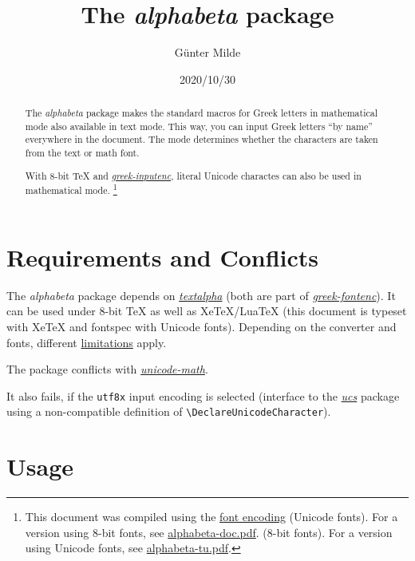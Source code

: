 \documentclass{article}
\newcommand{\engine}{XeTeX}
\newcommand{\engine}{LuaTeX}
\newcommand{\fontset}{fontspec with Unicode fonts}
\newcommand{\engine}{8-bit TeX}
\newcommand{\fontset}{fontenc with TeX fonts}
\begin{document}
\title{The \emph{alphabeta} package}
\author{Günter Milde}
\date{2020/10/30}
\maketitle

\begin{abstract}\noindent
The \emph{alphabeta} package makes the standard macros for Greek letters in
mathematical mode also available in text mode. This way, you can input Greek
letters ``by name'' everywhere in the document. The mode determines whether
the characters are taken from the text or math font.

With 8-bit TeX and
\emph{\href{http://www.ctan.org/pkg/greek-inputenc}{greek-inputenc}},
literal Unicode charactes can also be used in mathematical mode.
\footnote{
  This document was compiled using the \href{https://ctan.org/pkg/encguide}%
  {font encoding} \encodingdefault{}
  \ifdefined \UTFencname %
     (Unicode fonts).
     For a version using 8-bit fonts, see
     \href{alphabeta-doc.pdf}{alphabeta-doc.pdf}.
  \else
     (8-bit fonts).
     For a version using Unicode fonts, see
     \href{alphabeta-tu.pdf}{alphabeta-tu.pdf}.
  \fi
}
\end{abstract}


\section{Requirements and Conflicts}

The \emph{alphabeta} package depends on
\emph{\href{textalpha-doc.pdf}{textalpha}} (both are part of
\emph{\href{http://www.ctan.org/pkg/greek-fontenc}{greek-fontenc}}). It can
be used under 8-bit TeX as well as XeTeX/LuaTeX (this document is typeset
with \engine{} and \fontset). Depending on the converter and fonts, different
\hyperref[sec:limitations]{limitations} apply.

The package conflicts with
\href{http://www.ctan.org/pkg/unicode-math}{\emph{unicode-math}}.

It also fails, if the \texttt{utf8x} input encoding is selected (interface
to the \href{http://www.ctan.org/pkg/ucs}{\emph{ucs}} package using a
non-compatible definition of \verb+\DeclareUnicodeCharacter+).

\section{Usage}
\end{document}
